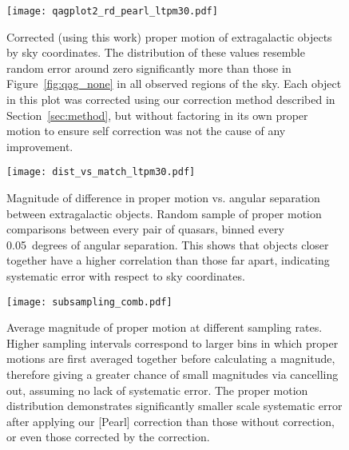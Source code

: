\documentclass[11pt,preprint]{aastex6}
\begin{document}
\begin{figure}
\centering
\texttt{[image: qagplot2\_rd\_pearl\_ltpm30.pdf]}
\caption{
	Corrected (using this work) proper motion of extragalactic objects by sky coordinates.
	The distribution of these values resemble random error around zero significantly more than those in Figure~\ref{fig:qag_none} in all observed regions of the sky.
	Each object in this plot was corrected using our correction method described in Section~\ref{sec:method}, but without factoring in its own proper motion to ensure self correction was not the cause of any improvement.
	\label{fig:qag_pearl}
}
\end{figure}

\begin{figure}
\centering
\texttt{[image: dist\_vs\_match\_ltpm30.pdf]}
\caption{
	Magnitude of difference in proper motion vs. angular separation between extragalactic objects.
	Random sample of proper motion comparisons between every pair of quasars, binned every 0.05~degrees of angular separation.
	This shows that objects closer together have a higher correlation than those far apart, indicating systematic error with respect to sky coordinates.
	\label{fig:dist_vs_match}
}
\end{figure}

\begin{figure}
\centering
\texttt{[image: subsampling\_comb.pdf]}
\caption{
	Average magnitude of proper motion at different sampling rates.
	Higher sampling intervals correspond to larger bins in which proper motions are first averaged together before calculating a magnitude, therefore giving a greater chance of small magnitudes via cancelling out, assuming no lack of systematic error.
	The proper motion distribution demonstrates significantly smaller scale systematic error after applying our [Pearl] correction than those without correction, or even those corrected by the \citet{Vickers2016} correction.
	\label{fig:subsampling}
}
\end{figure}
\end{document}
